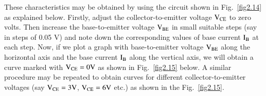  These characteristics may be obtained by using the circuit shown in Fig.~\ref{fig2.14} as explained below. Firstly, adjust the collector-to-emitter voltage $\textrm{V}_{\text{CE}}$ to zero volts. Then increase the base-to-emitter voltage $\textrm{V}_{\text{BE}}$ in small suitable steps (say in steps of 0.05 V) and note down the corresponding values of base current $\textrm{I}_{\textrm{B}}$ at each step. Now, if we plot a graph with base-to-emitter voltage $\textrm{V}_{\text{BE}}$ along the horizontal axis and the base current $\textrm{I}_{\textrm{B}}$ along the vertical axis, we will obtain a curve marked with $\textrm{V}_{\text{CE}}=0\textrm{V}$ as shown in Fig.~\ref{fig2.15} below. A similar procedure may be repeated to obtain curves for different collector-to-emitter voltages (say $\textrm{V}_{\text{CE}}=3\textrm{V}$, $\textrm{V}_{\text{CE}}=6\textrm{V}$ etc.) as shown in the Fig.~\ref{fig2.15}.

